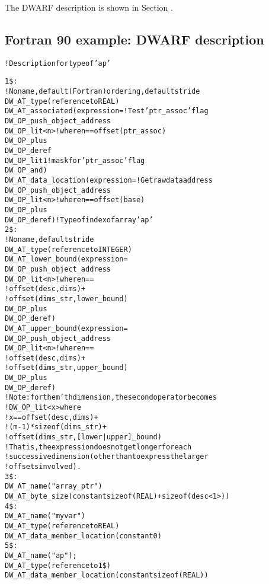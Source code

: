 The DWARF description is shown in 
Section .

\subsection{Fortran 90 example: DWARF description}
\label{app:fortran90exampledwarfdescription}

\begin{alltt}
! Description for type of 'ap'

1\$: 
        ! No name, default (Fortran) ordering, default stride
        DW\_AT\_type(reference to REAL)
        DW\_AT\_associated(expression= ! Test 'ptr\_assoc' flag
            DW\_OP\_push\_object\_address
            DW\_OP\_lit<n> ! where n == offset(ptr\_assoc)
            DW\_OP\_plus
            DW\_OP\_deref
            DW\_OP\_lit1 ! mask for 'ptr\_assoc' flag
            DW\_OP\_and)
        DW\_AT\_data\_location(expression= ! Get raw data address
            DW\_OP\_push\_object\_address
            DW\_OP\_lit<n> ! where n == offset(base)
            DW\_OP\_plus
            DW\_OP\_deref) ! Type of index of array 'ap'
2\$:     
        ! No name, default stride
        DW\_AT\_type(reference to INTEGER)
        DW\_AT\_lower\_bound(expression=
        DW\_OP\_push\_object\_address
            DW\_OP\_lit<n> ! where n ==
                         !  offset(desc, dims) +
                         !  offset(dims\_str, lower\_bound)
            DW\_OP\_plus
            DW\_OP\_deref)
        DW\_AT\_upper\_bound(expression=
            DW\_OP\_push\_object\_address
            DW\_OP\_lit<n> ! where n ==
                         !  offset(desc, dims) +
                         !  offset(dims\_str, upper\_bound)
            DW\_OP\_plus
            DW\_OP\_deref)
        !  Note: for the m'th dimension, the second operator becomes
        !  DW\_OP\_lit<x> where
        !  x == offset(desc, dims) +
        !  (m-1)*sizeof(dims\_str) +
        !  offset(dims\_str, [lower|upper]\_bound)
        !  That is, the expression does not get longer for each
        !  successive dimension (other than to express the larger
        !  offsets involved).
3\$: 
        DW\_AT\_name("array\_ptr")
        DW\_AT\_byte\_size(constant sizeof(REAL) + sizeof(desc<1>))
4\$:     
            DW\_AT\_name("myvar")
            DW\_AT\_type(reference to REAL)
            DW\_AT\_data\_member\_location(constant 0)
5\$:     
            DW\_AT\_name("ap");
            DW\_AT\_type(reference to 1\$)
            DW\_AT\_data\_member\_location(constant sizeof(REAL))


\end{alltt}
